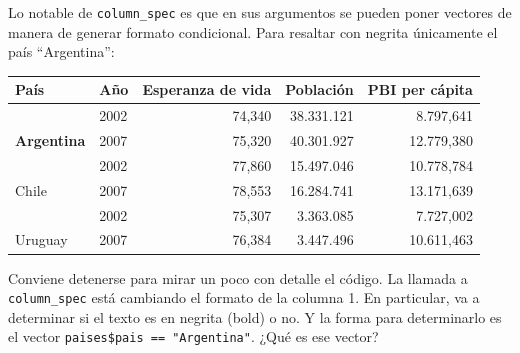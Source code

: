 \documentclass[
  openany]{book}
\newenvironment{Shaded}{\begin{snugshade}}{\end{snugshade}}
\newcommand{\AttributeTok}[1]{\textcolor[rgb]{0.77,0.63,0.00}{#1}}
\newcommand{\DecValTok}[1]{\textcolor[rgb]{0.00,0.00,0.81}{#1}}
\newcommand{\FunctionTok}[1]{\textcolor[rgb]{0.00,0.00,0.00}{#1}}
\newcommand{\NormalTok}[1]{#1}
\newcommand{\SpecialCharTok}[1]{\textcolor[rgb]{0.00,0.00,0.00}{#1}}
\newcommand{\StringTok}[1]{\textcolor[rgb]{0.31,0.60,0.02}{#1}}
\begin{document}
Lo notable de \texttt{column\_spec} es que en sus argumentos se pueden poner vectores de manera de generar formato condicional.
Para resaltar con negrita únicamente el país ``Argentina'':

\begin{Shaded}
\end{Shaded}

\begin{table}
\centering
\begin{tabular}{>{}l|l|r|r|r}
\hline
País & Año & Esperanza de vida & Población & PBI per cápita\\
\hline
 & 2002 & 74,340 & 38.331.121 & 8.797,641\\
\cline{2-5}
\multirow[t]{-2}{*}{\raggedright\arraybackslash \textbf{Argentina}} & 2007 & 75,320 & 40.301.927 & 12.779,380\\
\cline{1-5}
 & 2002 & 77,860 & 15.497.046 & 10.778,784\\
\cline{2-5}
\multirow[t]{-2}{*}{\raggedright\arraybackslash Chile} & 2007 & 78,553 & 16.284.741 & 13.171,639\\
\cline{1-5}
 & 2002 & 75,307 & 3.363.085 & 7.727,002\\
\cline{2-5}
\multirow[t]{-2}{*}{\raggedright\arraybackslash Uruguay} & 2007 & 76,384 & 3.447.496 & 10.611,463\\
\hline
\end{tabular}
\end{table}

Conviene detenerse para mirar un poco con detalle el código.
La llamada a \texttt{column\_spec} está cambiando el formato de la columna 1.
En particular, va a determinar si el texto es en negrita (bold) o no.
Y la forma para determinarlo es el vector \texttt{paises\$pais\ ==\ "Argentina"}.
¿Qué es ese vector?

\begin{Shaded}
\end{Shaded}
\end{document}

